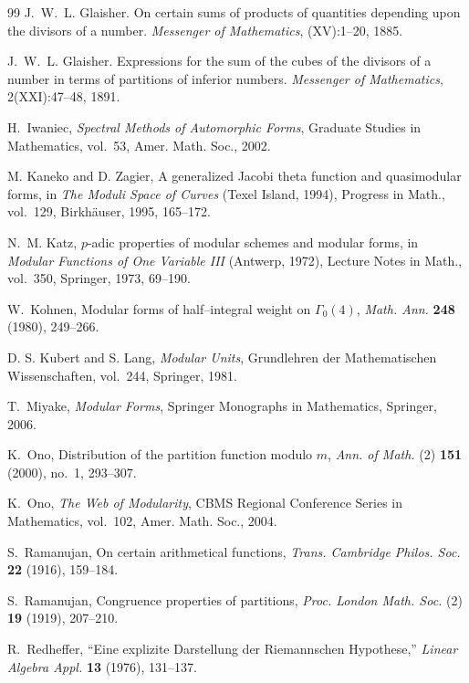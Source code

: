 \documentclass[11pt]{article}
\theoremstyle{definition}
\theoremstyle{remark}
\begin{document}
\begin{thebibliography}{99}
J.~W.~L. Glaisher.
\newblock On certain sums of products of quantities depending upon the divisors of a number.
\newblock \emph{Messenger of Mathematics}, (XV):1--20, 1885.

J.~W.~L. Glaisher.
\newblock Expressions for the sum of the cubes of the divisors of a number in terms of partitions of inferior numbers.
\newblock \emph{Messenger of Mathematics}, 2(XXI):47--48, 1891.


H.~Iwaniec,
\emph{Spectral Methods of Automorphic Forms},
Graduate Studies in Mathematics, vol.~53, Amer. Math. Soc., 2002.

M. Kaneko and D. Zagier,
A generalized Jacobi theta function and quasimodular forms,
in \emph{The Moduli Space of Curves} (Texel Island, 1994),
Progress in Math., vol.~129, Birkhäuser, 1995, 165--172.

N.~M. Katz,
$p$-adic properties of modular schemes and modular forms,
in \emph{Modular Functions of One Variable III} (Antwerp, 1972),
Lecture Notes in Math., vol.~350, Springer, 1973, 69--190.

W.~Kohnen,
Modular forms of half--integral weight on $\Gamma_0(4)$,
\emph{Math. Ann.} \textbf{248} (1980), 249--266.

D. S. Kubert and S. Lang,
\emph{Modular Units},
Grundlehren der Mathematischen Wissenschaften, vol.~244, Springer, 1981.

T.~Miyake,
\emph{Modular Forms},
Springer Monographs in Mathematics, Springer, 2006.

K.~Ono,
Distribution of the partition function modulo $m$,
\emph{Ann. of Math.} (2) \textbf{151} (2000), no.~1, 293--307.

K.~Ono,
\emph{The Web of Modularity},
CBMS Regional Conference Series in Mathematics, vol.~102, Amer. Math. Soc., 2004.

S.~Ramanujan,
On certain arithmetical functions,
\emph{Trans. Cambridge Philos. Soc.} \textbf{22} (1916), 159--184.

S.~Ramanujan,
Congruence properties of partitions,
\emph{Proc. London Math. Soc.} (2) \textbf{19} (1919), 207--210.

R.~Redheffer, ``Eine explizite Darstellung der Riemannschen Hypothese,''
\emph{Linear Algebra Appl.} \textbf{13} (1976), 131--137.



\end{thebibliography}
\end{document}
